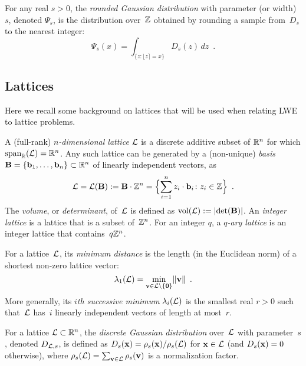 \documentclass{iacrcc}
\begin{document}
\begin{definition}
  \label{def:rounded-gaussian}
  For any real $s > 0$, the \emph{rounded Gaussian distribution} with
  parameter (or width)~$s$, denoted $\Psi_s$, is the distribution
  over~$\bbZ$ obtained by rounding a sample from~$D_{s}$ to the
  nearest integer:
  \begin{equation*}
    \Psi_s(x) = \int_{\{z\colon \lfloor z \rceil =
      x\}} D_s(z) \, dz \enspace .
  \end{equation*}
\end{definition}

\subsection{Lattices}
\label{sec:lattices}

Here we recall some background on lattices that will be used when
relating LWE to lattice problems.

\begin{definition}[Lattice]
  \label{def:lattice}
  A (full-rank) \emph{$n$-dimensional lattice} $\calL$ is a discrete
  additive subset of $\bbR^n$ for which
  $\text{span}_{\bbR}(\calL) = \bbR^{n}$. Any such lattice can be
  generated by a (non-unique) \emph{basis}
  $\bfB = \set{ \bfb_1, \dots, \bfb_n } \subset \bbR^n$ of linearly
  independent vectors, as
  \[ \calL = \calL(\bfB) := \bfB \cdot \bbZ^n = \set[\Big]{ \sum_{i =
        1}^n z_i \cdot \bfb_i\colon z_i \in \bbZ } \enspace . \] The
  \emph{volume}, or \emph{determinant}, of~$\calL$ is defined as
  $\vol(\calL) := \abs{\det(\bfB)}$. An \emph{integer lattice} is a
  lattice that is a subset of~$\bbZ^{n}$. For an integer $q$, a
  \emph{$q$-ary lattice} is an integer lattice that
  contains~$q\bbZ^{n}$.
\end{definition}

\begin{definition}
  \label{def:minimum-dist}
  For a lattice~$\calL$, its \emph{minimum distance} is the length (in
  the Euclidean norm) of a shortest non-zero lattice vector:
  \[ \lambda_1(\calL) = \min_{\bfv \in \calL \setminus \set{
        \mathbf{0} }} \length{ \bfv } \enspace . \]
  More generally, its \emph{$i$th successive minimum}
  $\lambda_i(\calL)$ is the smallest real $r > 0$ such that~$\calL$
  has~$i$ linearly independent vectors of length at most~$r$.
\end{definition}

\begin{definition}
  \label{def:discrete-gaussian}
  For a lattice $\calL \subset \bbR^{n}$, the \emph{discrete Gaussian
    distribution} over~$\calL$ with parameter~$s$, denoted
  $D_{\calL,s}$, is defined as
  $D_s(\bfx) = \rho_s(\bfx) / \rho_s(\calL)$ for $\bfx \in \calL$ (and
  $D_{s}(\bfx)=0$ otherwise), where
  $\rho_s(\calL) = \sum_{\bfv \in \calL}\rho_s(\bfv)$ is a
  normalization factor.
\end{definition}
\end{document}

